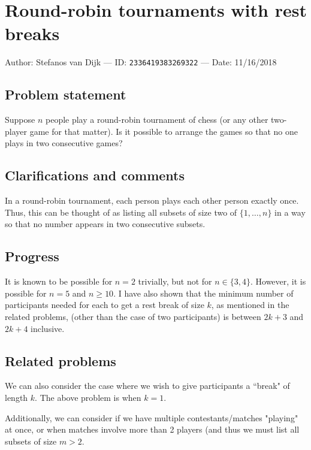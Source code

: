 
\section{Round-robin tournaments with rest breaks}

Author: Stefanos van Dijk --- ID: \verb`2336419383269322` --- Date: 11/16/2018

\subsection{Problem statement}

Suppose $n$ people play a round-robin tournament of chess (or any other two-player game for that matter). Is it possible to arrange the games so that no one plays in two consecutive games?

\subsection{Clarifications and comments}

In a round-robin tournament, each person plays each other person exactly once. Thus, this can be thought of as listing all subsets of size two of $\{1,\ldots,n\}$ in a way so that no number appears in two consecutive subsets.

\subsection{Progress}

It is known to be possible for $n=2$ trivially, but not for $n\in\{3,4\}$. However, it is possible for $n=5$ and $n\geq 10$. I have also shown that the minimum number of participants needed for each to get a rest break of size $k$, as mentioned in the related problems, (other than the case of two participants) is between $2k+3$ and $2k+4$ inclusive.

\subsection{Related problems}

We can also consider the case where we wish to give participants a ``break" of length $k$. The above problem is when $k=1$.

Additionally, we can consider if we have multiple contestants/matches "playing" at once, or when matches involve more than 2 players (and thus we must list all subsets of size $m>2$.

